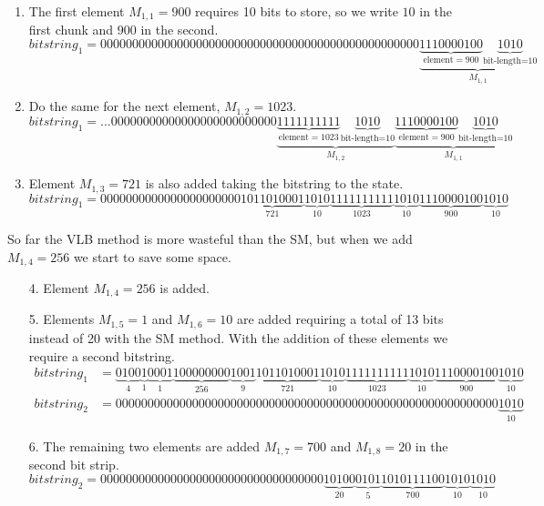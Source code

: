 \documentclass[10pt]{article}
\begin{document}
\begin{enumerate}
 \item The first element $M_{1,1}=900$ requires 10 bits to store, so we write $10$ in the first chunk and $900$ in the second.
 \begin{equation*} \label{eq:09}
 bitstring_1 = 00000000000000000000000000000000000000000000000000\underbrace{\underbrace{1110000100}_{\text{element} = 900}\underbrace{1010}_{\text{bit-length=10}}}_{M_{1,1}}
\end{equation*}
 \item Do the same for the next element, $M_{1,2}=1023$.
  \begin{equation*} \label{eq:10}
 bitstring_1 = \ldots00000000000000000000000000\underbrace{\underbrace{1111111111}_{\text{element} = 1023}\underbrace{1010}_{\text{bit-length=10}}}_{M_{1,2}}\underbrace{\underbrace{1110000100}_{\text{element} = 900}\underbrace{1010}_{\text{bit-length=10}}}_{M_{1,1}}
\end{equation*}
 \item Element $M_{1,3}=721$ is also added taking the bitstring to the state.
 \begin{equation*} \label{eq:11}
 bitstring_1 = 
 0000000000000000000000\underbrace{1011010001}_{721}\underbrace{1010}_{10}\underbrace{1111111111}_{1023}\underbrace{1010}_{10}\underbrace{1110000100}_{900}\underbrace{1010}_{10}
\end{equation*}
\end{enumerate}

So far the VLB method is more wasteful than the SM, but when we add $M_{1,4} =256$  we start to save some space.

\begin{enumerate}
 \item[4.] Element $M_{1,4} =256$ is added.  
 \item [5.] Elements $M_{1,5} =1$ and $M_{1,6} =10$ are added requiring a total of 13 bits instead of 20 with the SM method. With the addition of these elements we require a second bitstring.
 \begin{align*} \label{eq:12}
 bitstring_1 &=
 \underbrace{0100}_{4}\underbrace{1}_{1}\underbrace{0001}_{1}\underbrace{100000000}_{256}\underbrace{1001}_{9}\underbrace{1011010001}_{721}\underbrace{1010}_{10}\underbrace{1111111111}_{1023}\underbrace{1010}_{10}\underbrace{1110000100}_{900}\underbrace{1010}_{10} \\
 bitstring_2 &= 000000000000000000000000000000000000000000000000000000000000\underbrace{1010}_{10}
\end{align*}
 \item [6.] The remaining two elements are added $M_{1,7} =700$ and $M_{1,8} =20$ in the second bit strip.
 \begin{equation*} \label{eq:13}
 bitstring_2 = 00000000000000000000000000000000000\underbrace{10100}_{20}\underbrace{0101}_{5}\underbrace{1010111100}_{700}\underbrace{1010}_{10}\underbrace{1010}_{10}
\end{equation*}
\end{enumerate}
\end{document}
